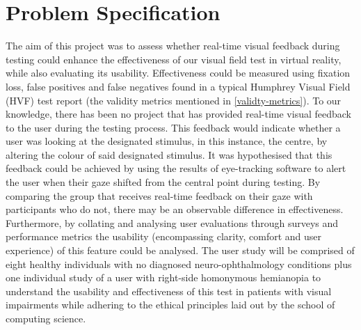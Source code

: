 \documentclass{l4proj}
\begin{document}
\section{Problem Specification}
The aim of this project was to assess whether real-time visual feedback during testing could enhance the effectiveness of our visual field test in virtual reality, while also evaluating its usability. Effectiveness could be measured using fixation loss, false positives and false negatives found in a typical Humphrey Visual Field (HVF) test report (the validity metrics mentioned in \ref{validty-metrics}). To our knowledge, there has been no project that has provided real-time visual feedback to the user during the testing process. This feedback would indicate whether a user was looking at the designated stimulus, in this instance, the centre, by altering the colour of said designated stimulus. It was hypothesised that this feedback could be achieved by using the results of eye-tracking software to alert the user when their gaze shifted from the central point during testing. By comparing the group that receives real-time feedback on their gaze with participants who do not, there may be an observable difference in effectiveness. Furthermore, by collating and analysing user evaluations through surveys and performance metrics the usability (encompassing clarity, comfort and user experience) of this feature could be analysed. The user study will be comprised of eight healthy individuals with no diagnosed neuro-ophthalmology conditions plus one individual study of a user with right-side homonymous hemianopia to understand the usability and effectiveness of this test in patients with visual impairments while adhering to the ethical principles laid out by the school of computing science.
\end{document}
